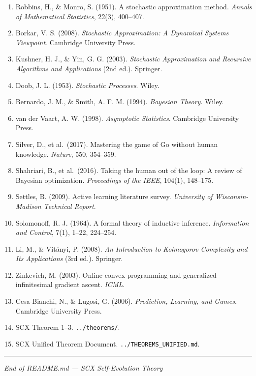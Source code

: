 \documentclass[
  12pt,
]{article}
\providecommand{\tightlist}{%
  \setlength{\itemsep}{0pt}\setlength{\parskip}{0pt}}
\begin{document}
\begin{enumerate}
\def\labelenumi{\arabic{enumi}.}
\tightlist
\item
  Robbins, H., \& Monro, S. (1951). A stochastic approximation method.
  \emph{Annals of Mathematical Statistics}, 22(3), 400--407.
\item
  Borkar, V. S. (2008). \emph{Stochastic Approximation: A Dynamical
  Systems Viewpoint}. Cambridge University Press.
\item
  Kushner, H. J., \& Yin, G. G. (2003). \emph{Stochastic Approximation
  and Recursive Algorithms and Applications} (2nd ed.). Springer.
\item
  Doob, J. L. (1953). \emph{Stochastic Processes}. Wiley.
\item
  Bernardo, J. M., \& Smith, A. F. M. (1994). \emph{Bayesian Theory}.
  Wiley.
\item
  van der Vaart, A. W. (1998). \emph{Asymptotic Statistics}. Cambridge
  University Press.
\item
  Silver, D., et al.~(2017). Mastering the game of Go without human
  knowledge. \emph{Nature}, 550, 354--359.
\item
  Shahriari, B., et al.~(2016). Taking the human out of the loop: A
  review of Bayesian optimization. \emph{Proceedings of the IEEE},
  104(1), 148--175.
\item
  Settles, B. (2009). Active learning literature survey.
  \emph{University of Wisconsin-Madison Technical Report}.
\item
  Solomonoff, R. J. (1964). A formal theory of inductive inference.
  \emph{Information and Control}, 7(1), 1--22, 224--254.
\item
  Li, M., \& Vit\'anyi, P. (2008). \emph{An Introduction to Kolmogorov
  Complexity and Its Applications} (3rd ed.). Springer.
\item
  Zinkevich, M. (2003). Online convex programming and generalized
  infinitesimal gradient ascent. \emph{ICML}.
\item
  Cesa-Bianchi, N., \& Lugosi, G. (2006). \emph{Prediction, Learning,
  and Games}. Cambridge University Press.
\item
  SCX Theorem 1--3. \texttt{../theorems/}.
\item
  SCX Unified Theorem Document. \texttt{../THEOREMS\_UNIFIED.md}.
\end{enumerate}

\begin{center}\rule{0.5\linewidth}{0.5pt}\end{center}

\emph{End of README.md --- SCX Self-Evolution Theory}
\end{document}
